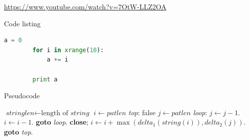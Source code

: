\documentclass{beamer}
\begin{document}
\begin{frame}
	\begin{center}
		\url{https://www.youtube.com/watch?v=7OtW-LLZ2OA}
	\end{center}
\end{frame}

\begin{frame}[fragile]{Code listing}
	\begin{lstlisting}[language=Python]
		a = 0
		for i in xrange(10):
			a += i

		print a
	\end{lstlisting}
\end{frame}

\begin{frame}{Pseudocode}

	{\tiny
	\begin{algorithmic}[1]
			\State $\textit{stringlen} \gets \text{length of }\textit{string}$
			\State $i \gets \textit{patlen}$ \pause
			\State \emph{top}:
			 \Return false
			\EndIf
			\State $j \gets \textit{patlen}$ \pause
			\State \emph{loop}:
				\State $j \gets j-1$.
				\State $i \gets i-1$.
				\State \textbf{goto} \emph{loop}.
				\State \textbf{close};
			\EndIf \pause
			\State $i \gets i+\max(\textit{delta}_1(\textit{string}(i)),\textit{delta}_2(j))$.
			\State \textbf{goto} \emph{top}.
		\EndProcedure
	\end{algorithmic}
	}
\end{frame}
\end{document}
